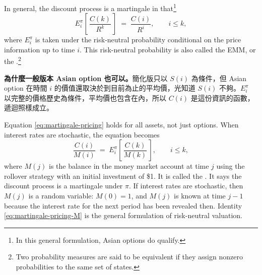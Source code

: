 \suppstart
{}
\suppend

In general, the discount process is a martingale in that\footnote{In this general formulation, Asian options do qualify.}
\begin{equation}
	E_{i}^{\pi}\left[\,\frac{C(k)}{R^{k}}\,\right] \;=\; \frac{C(i)}{R^{i}} , \qquad i\le k ,
	\label{eq:martingale-pricing}
\end{equation}
where $E_{i}^{\pi}$ is taken under the risk-neutral probability conditional on the price information up to time $i$.
This risk-neutral probability is also called the EMM, or the .\footnote{Two probability measures are said to be equivalent if they assign nonzero probabilities to the same set of states.}

\suppstart
{}

\begin{remark}
	\textbf{為什麼一般版本 Asian option 也可以。}簡化版只以 $S(i)$ 為條件，但 Asian option 在時間 $i$ 的價值還取決於到目前為止的平均價，光知道 $S(i)$ 不夠。$E_{i}^{\pi}$ 以完整的價格歷史為條件，平均價也包含在內，所以 $C(i)$ 是這份資訊的函數，遞迴照樣成立。
\end{remark}
\suppend


Equation \eqref{eq:martingale-pricing} holds for all assets, not just options.
When interest rates are stochastic, the equation becomes
\begin{equation}
	\frac{C(i)}{M(i)} \;=\; E_{i}^{\pi}\left[\,\frac{C(k)}{M(k)}\,\right] , \qquad i\le k ,
	\label{eq:martingale-pricing-M}
\end{equation}
where $M(j)$ is the balance in the money market account at time $j$ using the rollover strategy with an initial investment of \$1.
It is called the .
It says the discount process is a martingale under $\pi$.
If interest rates are stochastic, then $M(j)$ is a random variable: $M(0)=1$, and $M(j)$ is known at time $j-1$ because the interest rate for the next period has been revealed then.
Identity \eqref{eq:martingale-pricing-M} is the general formulation of risk-neutral valuation.


